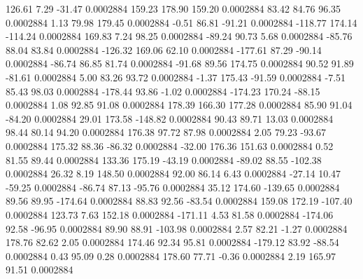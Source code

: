       126.61        7.29      -31.47     0.0002884
      159.23      178.90      159.20     0.0002884
       83.42       84.76       96.35     0.0002884
        1.13       79.98      179.45     0.0002884
       -0.51       86.81      -91.21     0.0002884
     -118.77      174.14     -114.24     0.0002884
      169.83        7.24       98.25     0.0002884
      -89.24       90.73        5.68     0.0002884
      -85.76       88.04       83.84     0.0002884
     -126.32      169.06       62.10     0.0002884
     -177.61       87.29      -90.14     0.0002884
      -86.74       86.85       81.74     0.0002884
      -91.68       89.56      174.75     0.0002884
       90.52       91.89      -81.61     0.0002884
        5.00       83.26       93.72     0.0002884
       -1.37      175.43      -91.59     0.0002884
       -7.51       85.43       98.03     0.0002884
     -178.44       93.86       -1.02     0.0002884
     -174.23      170.24      -88.15     0.0002884
        1.08       92.85       91.08     0.0002884
      178.39      166.30      177.28     0.0002884
       85.90       91.04      -84.20     0.0002884
       29.01      173.58     -148.82     0.0002884
       90.43       89.71       13.03     0.0002884
       98.44       80.14       94.20     0.0002884
      176.38       97.72       87.98     0.0002884
        2.05       79.23      -93.67     0.0002884
      175.32       88.36      -86.32     0.0002884
      -32.00      176.36      151.63     0.0002884
        0.52       81.55       89.44     0.0002884
      133.36      175.19      -43.19     0.0002884
      -89.02       88.55     -102.38     0.0002884
       26.32        8.19      148.50     0.0002884
       92.00       86.14        6.43     0.0002884
      -27.14       10.47      -59.25     0.0002884
      -86.74       87.13      -95.76     0.0002884
       35.12      174.60     -139.65     0.0002884
       89.56       89.95     -174.64     0.0002884
       88.83       92.56      -83.54     0.0002884
      159.08      172.19     -107.40     0.0002884
      123.73        7.63      152.18     0.0002884
     -171.11        4.53       81.58     0.0002884
     -174.06       92.58      -96.95     0.0002884
       89.90       88.91     -103.98     0.0002884
        2.57       82.21       -1.27     0.0002884
      178.76       82.62        2.05     0.0002884
      174.46       92.34       95.81     0.0002884
     -179.12       83.92      -88.54     0.0002884
        0.43       95.09        0.28     0.0002884
      178.60       77.71       -0.36     0.0002884
        2.19      165.97       91.51     0.0002884

